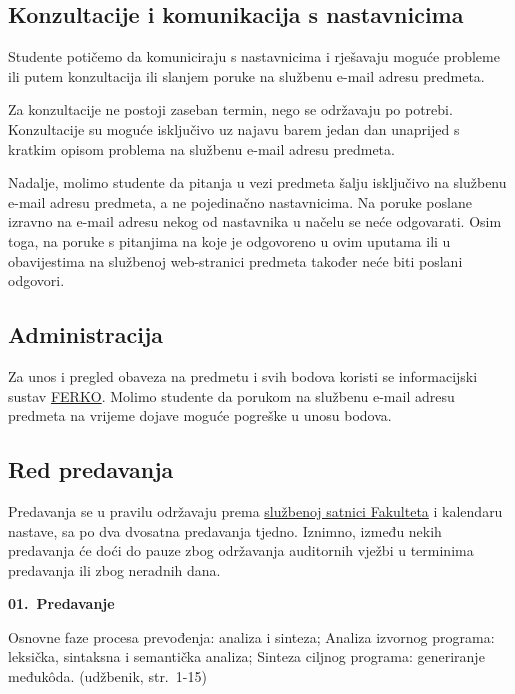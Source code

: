 \documentclass[times, 12pt, utf8]{book}
\newenvironment{myindentpar}[1]%
{\begin{list}{}%
         {\setlength{\leftmargin}{#1}}%
         \item[]%
}
{\end{list}}
\begin{document}
\subsection*{Konzultacije i komunikacija s nastavnicima}

Studente potičemo da komuniciraju s nastavnicima i rješavaju moguće probleme ili putem konzultacija ili slanjem poruke na službenu e-mail adresu predmeta.

Za konzultacije ne postoji zaseban termin, nego se održavaju po potrebi.
Konzultacije su moguće isključivo uz najavu barem jedan dan unaprijed s kratkim opisom problema na službenu e-mail adresu predmeta.

Nadalje, molimo studente da pitanja u vezi predmeta šalju isključivo na službenu e-mail adresu predmeta, a ne pojedinačno nastavnicima. 
Na poruke poslane izravno na e-mail adresu nekog od nastavnika u načelu se neće odgovarati.
Osim toga, na poruke s pitanjima na koje je odgovoreno u ovim uputama ili u obavijestima na službenoj web-stranici predmeta također neće biti poslani odgovori.

\cleardoublepage  
{}  
{}
\subsection*{Administracija}

Za unos i pregled obaveza na predmetu i svih bodova koristi se informacijski sustav \href{http://ferko.fer.hr}{FERKO}.
Molimo studente da porukom na službenu e-mail adresu predmeta na vrijeme dojave moguće pogreške u unosu bodova.

\cleardoublepage  
{}  
{}
\subsection*{Red predavanja}

Predavanja se u pravilu održavaju prema \href{http://web.zpr.fer.hr/satnica1/predmeti.htm}{službenoj satnici Fakulteta} i kalendaru nastave, sa po dva dvosatna predavanja tjedno.
Iznimno, između nekih predavanja će doći do pauze zbog održavanja auditornih vježbi u terminima predavanja ili zbog neradnih dana.

\textbf{01.~Predavanje} 
\begin{myindentpar}{30pt}
Osnovne faze procesa prevođenja: analiza i sinteza; Analiza izvornog programa: leksička, sintaksna i semantička analiza; Sinteza ciljnog programa: generiranje međukôda. (udžbenik, str.~1-15)
\end{myindentpar}
\end{document}
